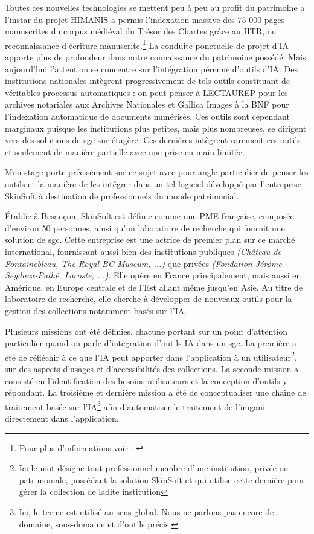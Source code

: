 Toutes ces nouvelles technologies se mettent peu à peu au profit du patrimoine a l'instar du projet HIMANIS a permis l'indexation massive des 75 000 pages manuscrites du corpus médiéval du Trésor des Chartes grâce au \gls{HTR}, ou reconnaissance d'écriture manuscrite.\footnote{ Pour plus d'informations voir : \cite{stutzmannRecherchePleinTexte2017/dec./15}}  La conduite ponctuelle de projet d'\gls{IA} apporte plus de profondeur dans notre connaissance du patrimoine possédé. Mais aujourd'hui l'attention se concentre sur l'intégration pérenne d'outils d'\gls{IA}. Des institutions nationales intègrent progressivement de tels outils constituant de véritables processus automatiques : on peut penser à LECTAUREP pour les archives notariales aux Archives Nationales et Gallica Images à la \gls{BNF} pour l'indexation automatique de documents numérisés.  Ces outils sont cependant marginaux puisque les institutions plus petites, mais plus nombreuses, se dirigent vers des solutions de \gls{sgc} sur étagère. Ces dernières intègrent rarement ces outils et seulement de manière partielle avec une prise en main limitée. 
		
Mon stage porte précisément sur ce sujet avec pour angle particulier de penser les outils et la manière de les intégrer dans un tel logiciel développé par l'entreprise SkinSoft à destination de professionnels du monde patrimonial.
		
Établie à Besançon, SkinSoft est définie comme une PME française, composée d'environ 50 personnes, ainsi qu'un laboratoire de recherche qui fournit une solution de \gls{sgc}. Cette entreprise est une actrice de premier plan sur ce marché international, fournissant aussi bien des institutions publiques \textit{(Château de Fontainebleau, The Royal BC Museum, ...)} que privées \textit{(Fondation Jérôme Seydoux-Pathé, Lacoste, ...)}. Elle opère en France principalement, mais aussi en Amérique, en Europe centrale et de l'Est allant même jusqu'en Asie. Au titre de laboratoire de recherche, elle cherche à développer de nouveaux outils pour la gestion des collections notamment basés sur l'\gls{IA}. 
		
Plusieurs missions ont été définies, chacune portant sur un point d'attention particulier quand on parle d'intégration d'outils \gls{IA} dans un \gls{sgc}. La première a été de réfléchir à ce que l'\gls{IA} peut apporter dans l'application à un utilisateur\footnote{Ici le mot  désigne tout professionnel membre d'une institution, privée ou patrimoniale, possédant la solution SkinSoft et qui utilise cette dernière pour gérer la collection de ladite institution}, sur des aspects d'usages et d'accessibilités des collections. La seconde mission a consisté en l'identification des besoins utilisateurs et la conception d'outils y répondant. La troisième et dernière mission a été de conceptualiser une chaîne de traitement basée sur l'\gls{IA}\footnote{Ici, le terme  est utilisé au sens global. Nous ne parlons pas encore de domaine, sous-domaine et d'outils précis.} afin d'automatiser le traitement de l'\gls{imgani} directement dans l'application. 
		
